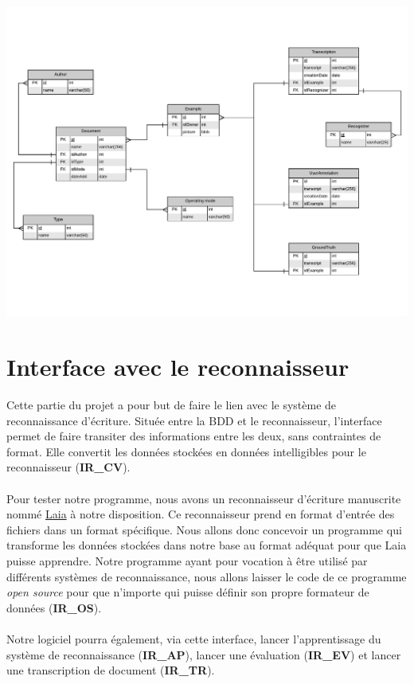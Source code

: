 \newpage

\begin{mdframed}[frametitle={Figure 6 : Modèle entité association de la base de données}, innerbottommargin=10]
\begin{center}
\includegraphics[width=\linewidth]{Modele_entite_association.pdf}
\end{center}
\end{mdframed}

\section{Interface avec le reconnaisseur}

Cette partie du projet a pour but de faire le lien avec le système de
reconnaissance d’écriture. Située entre la BDD et le reconnaisseur,
l’interface permet de faire transiter des informations entre les deux, sans
contraintes de format. Elle convertit les données stockées en données
intelligibles pour le reconnaisseur (\textbf{IR\_CV}).

\paragraph{}
Pour tester notre programme, nous avons un reconnaisseur d’écriture
manuscrite nommé
\href{https://github.com/jpuigcerver/Laia/tree/master/egs/iam}{Laia} à notre
disposition. Ce reconnaisseur prend en format d’entrée des fichiers dans un
format spécifique. Nous allons donc concevoir un programme qui transforme les
données stockées dans notre base au format adéquat pour que Laia puisse
apprendre. Notre programme ayant pour vocation à être utilisé par différents
systèmes de reconnaissance, nous allons laisser le code de ce programme
\textit{open source} pour que n’importe qui puisse définir son propre
formateur de données (\textbf{IR\_OS}).

\paragraph{}
Notre logiciel pourra également, via cette interface, lancer
l’apprentissage du système de reconnaissance (\textbf{IR\_AP}), lancer une
évaluation (\textbf{IR\_EV}) et lancer une transcription de document
(\textbf{IR\_TR}).